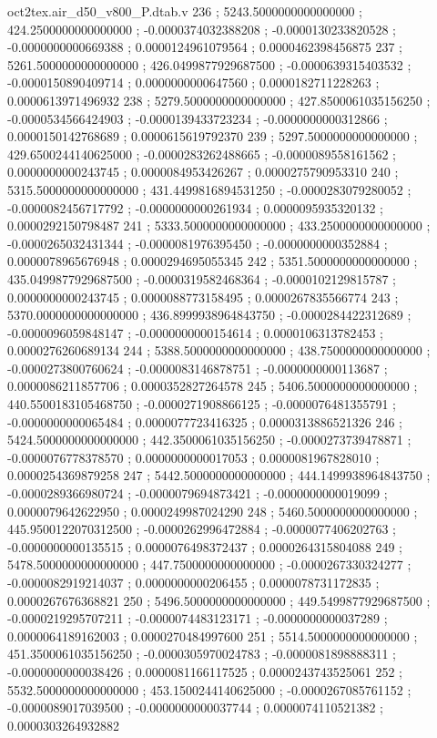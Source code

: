 \begin{filecontents}[overwrite]{oct2tex.air_d50_v800_P.dtab.v}
236 ; 5243.5000000000000000 ; 424.2500000000000000 ; -0.0000374032388208 ; -0.0000130233820528 ; -0.0000000000669388 ; 0.0000124961079564 ; 0.0000462398456875
237 ; 5261.5000000000000000 ; 426.0499877929687500 ; -0.0000639315403532 ; -0.0000150890409714 ; 0.0000000000647560 ; 0.0000182711228263 ; 0.0000613971496932
238 ; 5279.5000000000000000 ; 427.8500061035156250 ; -0.0000534566424903 ; -0.0000139433723234 ; -0.0000000000312866 ; 0.0000150142768689 ; 0.0000615619792370
239 ; 5297.5000000000000000 ; 429.6500244140625000 ; -0.0000283262488665 ; -0.0000089558161562 ; 0.0000000000243745 ; 0.0000084953426267 ; 0.0000275790953310
240 ; 5315.5000000000000000 ; 431.4499816894531250 ; -0.0000283079280052 ; -0.0000082456717792 ; -0.0000000000261934 ; 0.0000095935320132 ; 0.0000292150798487
241 ; 5333.5000000000000000 ; 433.2500000000000000 ; -0.0000265032431344 ; -0.0000081976395450 ; -0.0000000000352884 ; 0.0000078965676948 ; 0.0000294695055345
242 ; 5351.5000000000000000 ; 435.0499877929687500 ; -0.0000319582468364 ; -0.0000102129815787 ; 0.0000000000243745 ; 0.0000088773158495 ; 0.0000267835566774
243 ; 5370.0000000000000000 ; 436.8999938964843750 ; -0.0000284422312689 ; -0.0000096059848147 ; -0.0000000000154614 ; 0.0000106313782453 ; 0.0000276260689134
244 ; 5388.5000000000000000 ; 438.7500000000000000 ; -0.0000273800760624 ; -0.0000083146878751 ; -0.0000000000113687 ; 0.0000086211857706 ; 0.0000352827264578
245 ; 5406.5000000000000000 ; 440.5500183105468750 ; -0.0000271908866125 ; -0.0000076481355791 ; -0.0000000000065484 ; 0.0000077723416325 ; 0.0000313886521326
246 ; 5424.5000000000000000 ; 442.3500061035156250 ; -0.0000273739478871 ; -0.0000076778378570 ; 0.0000000000017053 ; 0.0000081967828010 ; 0.0000254369879258
247 ; 5442.5000000000000000 ; 444.1499938964843750 ; -0.0000289366980724 ; -0.0000079694873421 ; -0.0000000000019099 ; 0.0000079642622950 ; 0.0000249987024290
248 ; 5460.5000000000000000 ; 445.9500122070312500 ; -0.0000262996472884 ; -0.0000077406202763 ; -0.0000000000135515 ; 0.0000076498372437 ; 0.0000264315804088
249 ; 5478.5000000000000000 ; 447.7500000000000000 ; -0.0000267330324277 ; -0.0000082919214037 ; 0.0000000000206455 ; 0.0000078731172835 ; 0.0000267676368821
250 ; 5496.5000000000000000 ; 449.5499877929687500 ; -0.0000219295707211 ; -0.0000074483123171 ; -0.0000000000037289 ; 0.0000064189162003 ; 0.0000270484997600
251 ; 5514.5000000000000000 ; 451.3500061035156250 ; -0.0000305970024783 ; -0.0000081898888311 ; -0.0000000000038426 ; 0.0000081166117525 ; 0.0000243743525061
252 ; 5532.5000000000000000 ; 453.1500244140625000 ; -0.0000267085761152 ; -0.0000089017039500 ; -0.0000000000037744 ; 0.0000074110521382 ; 0.0000303264932882

\end{filecontents}
